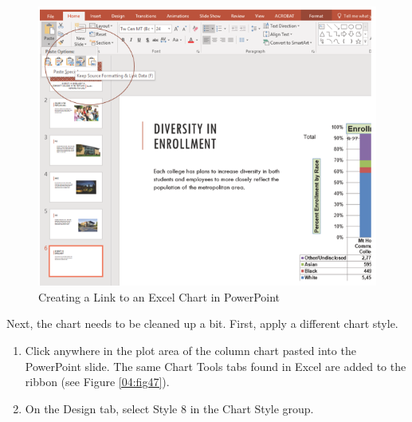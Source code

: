 \begin{figure}[H]
	\centering
	\includegraphics[width=\maxwidth{.95\linewidth}]{gfx/ch04_fig46}
	\caption{Creating a Link to an Excel Chart in PowerPoint}
	\label{04:fig46}
\end{figure}

Next, the chart needs to be cleaned up a bit. First, apply a different chart style.

\begin{enumerate}
	\item Click anywhere in the plot area of the column chart pasted into the PowerPoint slide. The same Chart Tools tabs found in Excel are added to the ribbon (see Figure \ref{04:fig47}). 
	\item On the Design tab, select Style $ 8 $ in the Chart Style group.
\end{enumerate}

